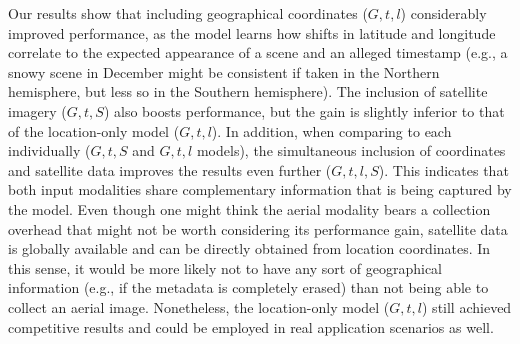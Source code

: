 \documentclass[journal]{IEEEtran}
\begin{document}
        \begin{table}[!t]
            \centering
            \caption{Results for the ablation study of input modalities and visual encoder architectures.} 
            \label{tab:ablation}
        \end{table}
        


        
        Our results show that including geographical coordinates ($G, t, l$) considerably improved performance, as the model learns how shifts in latitude and longitude correlate to the expected appearance of a scene and an alleged timestamp (e.g., a snowy scene in December might be consistent if taken in the Northern hemisphere, but less so in the Southern hemisphere). The inclusion of satellite imagery ($G, t, S$) also boosts performance, but the gain is slightly inferior to that of the location-only model ($G, t, l$). In addition, when comparing to each individually ($G,t,S$ and $G,t,l$ models), the simultaneous inclusion of coordinates and satellite data improves the results even further ($G,t,l,S$). This indicates that both input modalities share complementary information that is being captured by the model. Even though one might think the aerial modality bears a collection overhead that might not be worth considering its performance gain, satellite data is globally available and can be directly obtained from location coordinates. In this sense, it would be more likely not to have any sort of geographical information (e.g., if the metadata is completely erased) than not being able to collect an aerial image. Nonetheless, the location-only model ($G, t, l$) still achieved competitive results and could be employed in real application scenarios as well.
        
\end{document}
